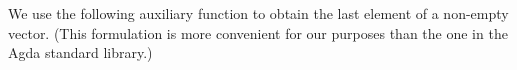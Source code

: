 \begin{fence}
\begin{code}%
\>[0]\AgdaSpace{}%
\AgdaSymbol{:}\AgdaSpace{}%
\AgdaSymbol{(}\AgdaSpace{}%
\AgdaSymbol{:}\AgdaSpace{}%
\AgdaSymbol{)}\AgdaSpace{}%
\AgdaSpace{}%
\AgdaSpace{}%
\AgdaSpace{}%
\AgdaSymbol{(}\AgdaSpace{}%
\AgdaSymbol{)}\AgdaSpace{}%
\AgdaSpace{}%
\<%
\\
\>[0]\AgdaSpace{}%
\AgdaSpace{}%
\AgdaSymbol{(}\AgdaSpace{}%
\AgdaSpace{}%
\AgdaInductiveConstructor{[]}\AgdaSymbol{)}\AgdaSpace{}%
\AgdaSymbol{=}\AgdaSpace{}%
\<%
\\
\>[0]\AgdaSpace{}%
\AgdaSymbol{(}\AgdaSpace{}%
\AgdaSymbol{)}\AgdaSpace{}%
\AgdaSymbol{(}\AgdaSpace{}%
\AgdaSpace{}%
\AgdaSpace{}%
\AgdaSpace{}%
\AgdaSymbol{)}\AgdaSpace{}%
\AgdaSymbol{=}%
\>[38]\AgdaSpace{}%
\AgdaSpace{}%
%
\>[53]%
\>[56]\AgdaSpace{}%
\AgdaSpace{}%
\AgdaSymbol{(}\AgdaSpace{}%
\AgdaSpace{}%
\AgdaSymbol{)}\<%
\end{code}
\end{fence}

We use the following auxiliary function to obtain the last element of a
non-empty vector. (This formulation is more convenient for our purposes
than the one in the Agda standard library.)


